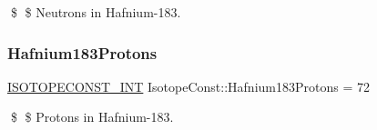 \$ \$ Neutrons in Hafnium-\/183. \mbox{\label{group___isotope_const-_hafnium-_hf183_ga83c83e0ab268aa7c3084e62d62188c3b}} 
\subsubsection{\texorpdfstring{Hafnium183\+Protons}{Hafnium183Protons}}
{\footnotesize\ttfamily \mbox{\hyperlink{group___isotope_const-_macros_ga5f18360b3e99483a35c32d789e62621c}{I\+S\+O\+T\+O\+P\+E\+C\+O\+N\+S\+T\+\_\+\+I\+NT}} Isotope\+Const\+::\+Hafnium183\+Protons = 72}

\$ \$ Protons in Hafnium-\/183. 